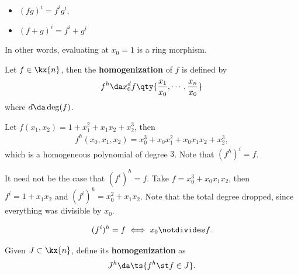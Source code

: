 \begin{remark}

\envlist

\begin{itemize}
\tightlist
\item
  \((fg)^i = f^i g^i\),
\item
  \((f+g)^i = f^i + g^i\)
\end{itemize}

In other words, evaluating at \(x_0 = 1\) is a ring morphism.

\end{remark}

\begin{definition}

Let \(f\in \kx{n}\), then the \textbf{homogenization} of \(f\) is
defined by
\begin{align*}  
f^h \da x_0^d f\qty{ {x_1 \over x_0}, \cdots, {x_n \over x_0} }
\end{align*} where \(d\da \deg(f)\).

\end{definition}

\begin{example}[?]

Let \(f(x_1, x_2) = 1 + x_1^2 + x_1 x_2 + x_2^3\), then
\begin{align*}  
f^h(x_0, x_1, x_2) = x_0^3 + x_0 x_1^2 + x_0 x_1 x_2 + x_2^3
,\end{align*} which is a homogeneous polynomial of degree \(3\). Note
that \((f^h)^i = f\).

\end{example}

\begin{example}[?]

It need not be the case that \((f^i)^h = f\). Take
\(f = x_0^3 + x_0 x_1 x_2\), then \(f^i = 1 + x_1 x_2\) and
\((f^i)^h = x_0^2 + x_1 x_2\). Note that the total degree dropped, since
everything was divisible by \(x_0\).

\end{example}

\begin{remark}

\begin{align*}  
(f^i)^h = f \iff x_0 \notdivides f
.\end{align*}

\end{remark}

\begin{definition}

Given \(J\subset \kx{n}\), define its \textbf{homogenization} as
\begin{align*}  
J^h \da \ts{f^h \st f\in J}
.\end{align*}

\end{definition}

